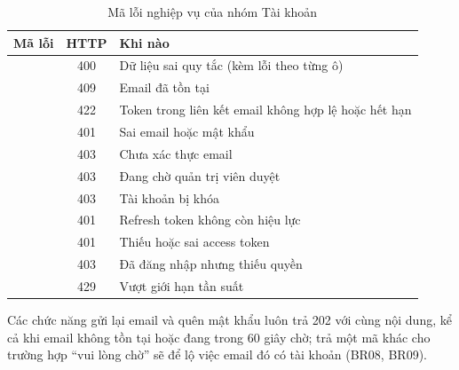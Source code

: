 \begin{table}[H]
  \centering
  \caption{Mã lỗi nghiệp vụ của nhóm Tài khoản}
  \label{tab:tk-ma-loi}
  \begin{tabularx}{\textwidth}{lcL}
    \toprule
    \textbf{Mã lỗi} & \textbf{HTTP} & \textbf{Khi nào} \\
    \midrule
             & 400 & Dữ liệu sai quy tắc (kèm lỗi theo từng ô) \\
             & 409 & Email đã tồn tại \\
           & 422 & Token trong liên kết email không hợp lệ hoặc hết hạn \\
     & 401 & Sai email hoặc mật khẩu \\
      & 403 & Chưa xác thực email \\
         & 403 & Đang chờ quản trị viên duyệt \\
          & 403 & Tài khoản bị khóa \\
         & 401 & Refresh token không còn hiệu lực \\
           & 401 & Thiếu hoặc sai access token \\
              & 403 & Đã đăng nhập nhưng thiếu quyền \\
        & 429 & Vượt giới hạn tần suất \\
    \bottomrule
  \end{tabularx}
\end{table}

Các chức năng gửi lại email và quên mật khẩu luôn trả 202 với cùng nội dung, kể cả khi email không
tồn tại hoặc đang trong 60 giây chờ; trả một mã khác cho trường hợp ``vui lòng chờ'' sẽ để lộ việc
email đó có tài khoản (BR08, BR09).
